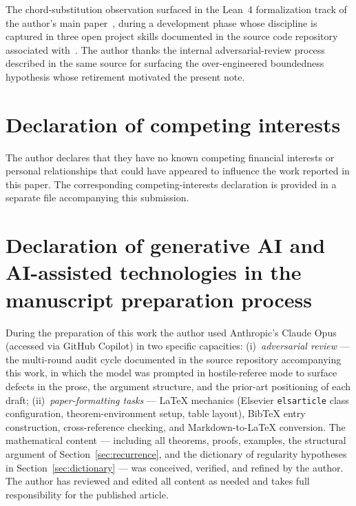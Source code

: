 \documentclass[review,12pt,a4paper]{elsarticle}
\theoremstyle{remark}
\begin{document}
The chord-substitution observation surfaced in the Lean~4 formalization
track of the author's main paper~\cite{El2}, during a development phase
whose discipline is captured in three open project skills documented in
the source code repository associated with~\cite{El2}. The author thanks
the internal adversarial-review process described in the same source for
surfacing the over-engineered boundedness hypothesis whose retirement
motivated the present note.

\section*{Declaration of competing interests}

The author declares that they have no known competing financial interests
or personal relationships that could have appeared to influence the work
reported in this paper. The corresponding competing-interests declaration
is provided in a separate file accompanying this submission.

\section*{Declaration of generative AI and AI-assisted technologies in the manuscript preparation process}

During the preparation of this work the author used Anthropic's Claude
Opus (accessed via GitHub Copilot) in two specific capacities:
(i)~\emph{adversarial review} --- the multi-round audit cycle documented
in the source repository accompanying this work, in which the model was
prompted in hostile-referee mode to surface defects in the prose, the
argument structure, and the prior-art positioning of each draft;
(ii)~\emph{paper-formatting tasks} --- LaTeX mechanics (Elsevier
\texttt{elsarticle} class configuration, theorem-environment setup, table
layout), BibTeX entry construction, cross-reference checking, and
Markdown-to-LaTeX conversion. The mathematical content --- including all
theorems, proofs, examples, the structural argument of
Section~\ref{sec:recurrence}, and the dictionary of regularity hypotheses
in Section~\ref{sec:dictionary} --- was conceived, verified, and refined
by the author. The author has reviewed and edited all content as needed
and takes full responsibility for the published article.



\end{document}
